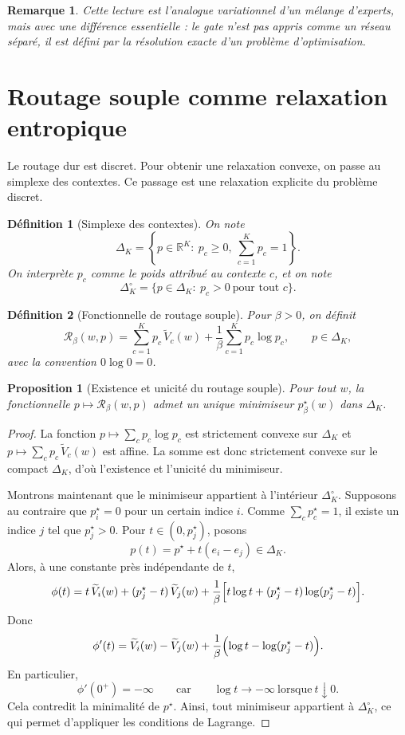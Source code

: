 \documentclass[11pt,a4paper]{article}
\newtheorem{definition}{Définition}[section]
\newtheorem{proposition}{Proposition}[section]
\newtheorem{remark}{Remarque}[section]
\newcommand{\R}{\mathbb R}
\newcommand{\Rcal}{\mathcal R}
\begin{document}
\begin{remark}
Cette lecture est l'analogue variationnel d'un mélange d'experts, mais avec une différence essentielle : le gate n'est pas appris comme un réseau séparé, il est défini par la résolution exacte d'un problème d'optimisation.
\end{remark}

\section{Routage souple comme relaxation entropique}

Le routage dur est discret. Pour obtenir une relaxation convexe, on passe au simplexe des contextes. Ce passage est une relaxation explicite du problème discret.

\begin{definition}[Simplexe des contextes]
On note
\[
\Delta_K
=
\left\{
p\in\R^K:\ p_c\ge 0,\ \sum_{c=1}^K p_c=1
\right\}.
\]
On interprète \(p_c\) comme le poids attribué au contexte \(c\), et on note
\[
\Delta_K^\circ
=
\{p\in\Delta_K:\ p_c>0\ \text{pour tout }c\}.
\]
\end{definition}

\begin{definition}[Fonctionnelle de routage souple]
Pour \(\beta>0\), on définit
\[
\Rcal_\beta(w,p)
=
\sum_{c=1}^K p_c\,\widetilde V_c(w)
+
\frac{1}{\beta}\sum_{c=1}^K p_c\log p_c,
\qquad p\in\Delta_K,
\]
avec la convention \(0\log 0=0\).
\end{definition}

\begin{proposition}[Existence et unicité du routage souple]
Pour tout \(w\), la fonctionnelle \(p\mapsto \Rcal_\beta(w,p)\) admet un unique minimiseur \(p^\star_\beta(w)\) dans \(\Delta_K\).
\end{proposition}

\begin{proof}
La fonction \(p\mapsto \sum_c p_c\log p_c\) est strictement convexe sur \(\Delta_K\) et \(p\mapsto \sum_c p_c\,\widetilde V_c(w)\) est affine. La somme est donc strictement convexe sur le compact \(\Delta_K\), d'où l'existence et l'unicité du minimiseur.

Montrons maintenant que le minimiseur appartient à l'intérieur \(\Delta_K^\circ\). Supposons au contraire que \(p^\star_i=0\) pour un certain indice \(i\). Comme \(\sum_c p^\star_c=1\), il existe un indice \(j\) tel que \(p^\star_j>0\). Pour \(t\in(0,p^\star_j)\), posons
\[
p(t)=p^\star+t(e_i-e_j)\in\Delta_K.
\]
Alors, à une constante près indépendante de \(t\),
\[
\phi(t)
=
t\,\widetilde V_i(w)
+
(p^\star_j-t)\,\widetilde V_j(w)
+
\frac{1}{\beta}\Bigl[t\log t+(p^\star_j-t)\log(p^\star_j-t)\Bigr].
\]
Donc
\[
\phi'(t)
=
\widetilde V_i(w)-\widetilde V_j(w)
+
\frac{1}{\beta}\Bigl(\log t-\log(p^\star_j-t)\Bigr).
\]
En particulier,
\[
\phi'(0^+)=-\infty
\qquad\text{car}\qquad
\log t\to-\infty\ \text{lorsque}\ t\downarrow0.
\]
Cela contredit la minimalité de \(p^\star\). Ainsi, tout minimiseur appartient à \(\Delta_K^\circ\), ce qui permet d'appliquer les conditions de Lagrange.
\end{proof}
\end{document}
